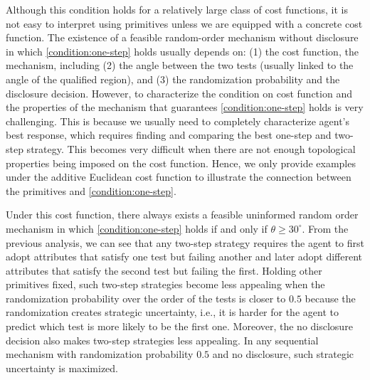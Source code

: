 Although this condition holds for a relatively large class of cost functions, it is not easy to interpret using primitives unless we are equipped with a concrete cost function.
The existence of a feasible  random-order mechanism without disclosure in which \cref{condition:one-step} holds usually depends on: (1) the cost function,  the mechanism, including (2) the angle between the two tests (usually linked to the angle of the qualified region), and (3) the randomization probability and the disclosure decision.
However, to characterize the condition on cost function and the properties of the mechanism that guarantees \cref{condition:one-step} holds is very challenging.
This is because we usually need to completely characterize agent's best response, which requires finding and comparing the best one-step and two-step strategy.
This becomes very difficult when there are not enough topological properties being imposed on the cost function.
Hence, we only provide examples under the additive Euclidean cost function to illustrate the connection between the primitives and \cref{condition:one-step}.

 Under this cost function, there always exists a feasible uninformed random order mechanism in which \cref{condition:one-step} holds if and only if $\theta\geq 30^{\circ}$.
From the previous analysis, we can see that any two-step strategy requires the agent to first adopt attributes that satisfy one test but failing another and later adopt different attributes that satisfy the second test but failing the first.
Holding other primitives fixed, such two-step strategies become less appealing when the randomization probability over the order of the tests is closer to $0.5$ because the randomization creates strategic uncertainty, i.e., it is harder for the agent to predict which test is more likely to be the first one.
Moreover, the no disclosure decision also makes two-step strategies less appealing.
In any sequential mechanism with randomization probability $0.5$ and no disclosure, such strategic uncertainty is maximized.


